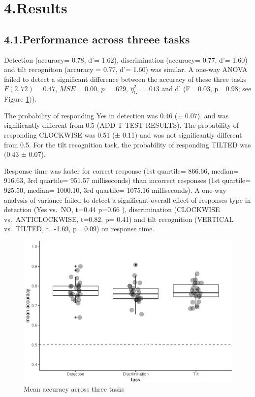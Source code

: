 \documentclass[
]{article}
\begin{document}
\hypertarget{results}{%
\section{4.Results}\label{results}}

\hypertarget{performance-across-threee-tasks}{%
\subsection{4.1.Performance across threee
tasks}\label{performance-across-threee-tasks}}

Detection (accuracy= 0.78, d'= 1.62), discrimination (accuracy= 0.77,
d'= 1.60) and tilt recognition (accuracy = 0.77, d'= 1.60) was similar.
A one-way ANOVA failed to detect a significant difference between the
accuracy of these three tasks \(F(2, 72) = 0.47\),
\(\mathit{MSE} = 0.00\), \(p = .629\), \(\hat{\eta}^2_G = .013\) and d'
(F= 0.03, p= 0.98; see Figure \ref{fig:accuracy})).

The probability of responding Yes in detection was 0.46 (± 0.07), and
was significantly different from 0.5 (ADD T TEST RESULTS). The
probability of responding CLOCKWISE was 0.51 (± 0.11) and was not
significantly different from 0.5. For the tilt recognition task, the
probability of responding TILTED was (0.43 ± 0.07).

Response time was faster for correct response (1st quartile= 866.66,
median= 916.63, 3rd quartile= 951.57 milliseconds) than incorrect
responses (1st quartile= 925.50, median= 1000.10, 3rd quartile= 1075.16
milliseconds). A one-way analysis of variance failed to detect a
significant overall effect of responses type in detection (Yes vs.~NO,
t=0.44 p=0.66 ), discrimination (CLOCKWISE vs.~ANTICLOCKWISE, t=0.82, p=
0.41) and tilt recognition (VERTICAL vs.~TILTED, t=-1.69, p= 0.09) on
response time.

\begin{figure}
\centering
\includegraphics{Chudi-Thesis-2020_files/figure-latex/accuracy_figure-1.pdf}
\caption{\label{fig:accuracy} Mean accuracy across three tasks}
\end{figure}
\end{document}
